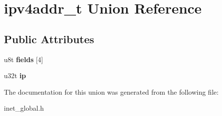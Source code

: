 \hypertarget{unionipv4addr__t}{}\section{ipv4addr\+\_\+t Union Reference}
\label{unionipv4addr__t}
\subsection*{Public Attributes}
\begin{DoxyCompactItemize}
\item 
\mbox{\label{unionipv4addr__t_ad433218e640ad7a4cfa6382a4edc026d}} 
u8t {\bfseries fields} \mbox{[}4\mbox{]}
\item 
\mbox{\label{unionipv4addr__t_a7ad3271285fde5de3a499b380f668851}} 
u32t {\bfseries ip}
\end{DoxyCompactItemize}


The documentation for this union was generated from the following file\+:\begin{DoxyCompactItemize}
\item 
inet\+\_\+global.\+h\end{DoxyCompactItemize}
